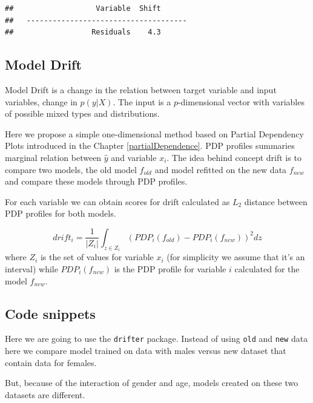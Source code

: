 \documentclass[12pt,]{krantz}
\begin{document}
\begin{verbatim}
##                   Variable  Shift
##   -------------------------------------
##                  Residuals    4.3
\end{verbatim}

\hypertarget{model-drift}{%
\subsection{Model Drift}\label{model-drift}}

Model Drift is a change in the relation between target variable and input variables, change in \(p(y|X)\). The input is a \(p\)-dimensional vector with variables of possible mixed types and distributions.

Here we propose a simple one-dimensional method based on Partial Dependency Plots introduced in the Chapter \ref{partialDependence}. PDP profiles summaries marginal relation between \(\hat y\) and variable \(x_i\). The idea behind concept drift is to compare two models, the old model \(f_{old}\) and model refitted on the new data \(f_{new}\) and compare these models through PDP profiles.

For each variable we can obtain scores for drift calculated as \(L_2\) distance between PDP profiles for both models.

\[
drift_{i} = \frac 1 {|Z_i|}\int_{z\in Z_i} (PDP_i(f_{old}) - PDP_i(f_{new}))^2 dz
\]
where \(Z_i\) is the set of values for variable \(x_i\) (for simplicity we assume that it's an interval) while \(PDP_i(f_{new})\) is the PDP profile for variable \(i\) calculated for the model \(f_{new}\).

\hypertarget{code-snippets-1}{%
\subsection{Code snippets}\label{code-snippets-1}}

Here we are going to use the \texttt{drifter} package.
Instead of using \texttt{old} and \texttt{new} data here we compare model trained on data with males versus new dataset that contain data for females.

But, because of the interaction of gender and age, models created on these two datasets are different.
\end{document}
